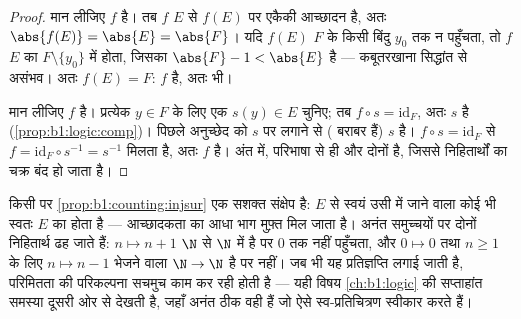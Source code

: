 \begin{proof}
मान लीजिए $f$  है। तब $f$ $E$ से $f(E)$ पर एकैकी आच्छादन है, अतः
$\abs{f(E)} = \abs{E} = \abs{F}$। यदि $f(E)$ $F$ के किसी बिंदु $y_0$ तक न
पहुँचता, तो $f$ $E$ का $F \setminus \{y_0\}$ में   होता,
जिसका  $\abs{F} - 1 < \abs{E}$ है --- कबूतरखाना सिद्धांत से असंभव। अतः
$f(E) = F$: $f$  है, अतः  भी।

मान लीजिए $f$  है। प्रत्येक $y \in F$ के लिए एक  $s(y)
\in E$ चुनिए; तब $f \circ s = \mathrm{id}_F$, अतः $s$  है
(\cref{prop:b1:logic:comp})। पिछले अनुच्छेद को $s$ पर लगाने से ( बराबर
हैं) $s$  है। $f \circ s = \mathrm{id}_F$ से $f = \mathrm{id}_F
\circ s^{-1} = s^{-1}$ मिलता है, अतः $f$  है। अंत में,   परिभाषा से ही  और  दोनों है, जिससे
निहितार्थों का चक्र बंद हो जाता है।
\end{proof}

\begin{example}[परिमितता अनिवार्य है]\label{ex:b1:counting:finiteonly}
किसी \emph{}  पर \cref{prop:b1:counting:injsur} एक सशक्त
संक्षेप है: $E$ से स्वयं उसी में जाने वाला कोई भी   स्वतः
$E$ का  होता है ---  आच्छादकता का आधा भाग मुफ़्त मिल जाता है।
अनंत समुच्चयों पर दोनों निहितार्थ ढह जाते हैं: $n \mapsto n + 1$ $\N$ से
$\N$ में  है पर $0$ तक नहीं पहुँचता, और $0 \mapsto 0$ तथा $n \geq 1$ के
लिए $n \mapsto n - 1$ भेजने वाला  $\N \to \N$  है पर 
नहीं। जब भी यह प्रतिज्ञप्ति लगाई जाती है, परिमितता की परिकल्पना सचमुच काम कर
रही होती है --- यही विषय \cref{ch:b1:logic} की सप्ताहांत समस्या दूसरी ओर से
देखती है, जहाँ अनंत  ठीक वही हैं जो ऐसे स्व-प्रतिचित्रण स्वीकार करते
हैं।
\end{example}

